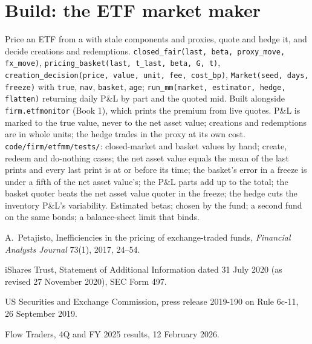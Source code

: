 \section{Build: the ETF market maker}\label{bld:hf:etf-market-making:etfmm}

\begin{build}
 Price an ETF from a  with stale components and proxies, quote and hedge it, and decide creations and redemptions.
 \texttt{closed\_fair(last, beta, proxy\_move, fx\_move)}, \texttt{pricing\_basket(last, t\_last, beta, G, t)},
\texttt{creation\_decision(price, value, unit, fee, cost\_bp)}, \texttt{Market(seed, days, freeze)} with \texttt{true}, \texttt{nav},
\texttt{basket}, \texttt{age}; \texttt{run\_mm(market, estimator, hedge, flatten)} returning daily P\&L by part and the quoted mid. Built
alongside \texttt{firm.etfmonitor} (Book 1), which prints the premium from live quotes.
 P\&L is marked to the true value, never to the net asset value; creations and redemptions are in whole units; the hedge trades in the
proxy at its own cost.
 \texttt{code/firm/etfmm/tests/}: closed-market and basket values by hand; create, redeem and do-nothing cases; the net
asset value equals the mean of the last prints and every last print is at or before its time; the basket's error in a freeze is under a fifth of the
net asset value's; the P\&L parts add up to the total; the basket quoter beats the net asset value quoter in the freeze; the hedge cuts the inventory
P\&L's variability.
 Estimated betas;  chosen by the fund; a second fund on the same bonds; a balance-sheet limit that binds.
\end{build}

\begin{omsources}
\item A.~Petajisto, Inefficiencies in the pricing of exchange-traded funds, \emph{Financial Analysts Journal} 73(1), 2017, 24--54.
\item iShares Trust, Statement of Additional Information dated 31 July 2020 (as revised 27 November 2020), SEC Form 497.
\item US Securities and Exchange Commission, press release 2019-190 on Rule 6c-11, 26 September 2019.
\item Flow Traders, 4Q and FY 2025 results, 12 February 2026.
\end{omsources}

